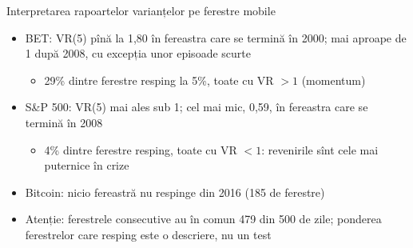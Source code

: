 \begin{frame}{Interpretarea rapoartelor varianțelor pe ferestre mobile}
\itemsize{\small}
\begin{itemize}
    \item BET: VR(5) pînă la 1{,}80 în fereastra care se termină în 2000; mai aproape de 1 după 2008, cu excepția unor episoade scurte
    \begin{itemize}
        \item 29\% dintre ferestre resping la 5\%, toate cu VR $> 1$ (momentum)
    \end{itemize}
    \item S\&P 500: VR(5) mai ales sub 1; cel mai mic, 0{,}59, în fereastra care se termină în 2008
    \begin{itemize}
        \item 4\% dintre ferestre resping, toate cu VR $< 1$: revenirile sînt cele mai puternice în crize
    \end{itemize}
    \item Bitcoin: nicio fereastră nu respinge din 2016 (185 de ferestre)
    \item Atenție: ferestrele consecutive au în comun 479 din 500 de zile; ponderea ferestrelor care resping este o descriere, nu un test
\end{itemize}
\end{frame}

